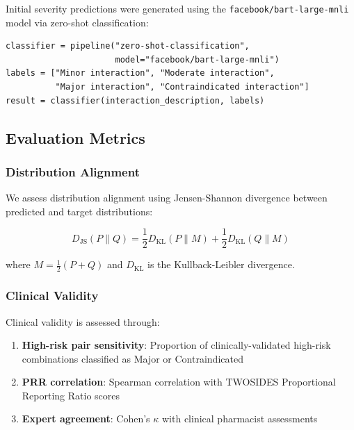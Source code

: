 \documentclass[11pt,a4paper]{article}
\begin{document}
Initial severity predictions were generated using the \texttt{facebook/bart-large-mnli} model via zero-shot classification:

\begin{verbatim}
classifier = pipeline("zero-shot-classification",
                      model="facebook/bart-large-mnli")
labels = ["Minor interaction", "Moderate interaction",
          "Major interaction", "Contraindicated interaction"]
result = classifier(interaction_description, labels)
\end{verbatim}

\subsection{Evaluation Metrics}

\subsubsection{Distribution Alignment}

We assess distribution alignment using Jensen-Shannon divergence between predicted and target distributions:

\begin{equation}
D_{\text{JS}}(P \| Q) = \frac{1}{2} D_{\text{KL}}(P \| M) + \frac{1}{2} D_{\text{KL}}(Q \| M)
\end{equation}

where $M = \frac{1}{2}(P + Q)$ and $D_{\text{KL}}$ is the Kullback-Leibler divergence.

\subsubsection{Clinical Validity}

Clinical validity is assessed through:
\begin{enumerate}
    \item \textbf{High-risk pair sensitivity}: Proportion of clinically-validated high-risk combinations classified as Major or Contraindicated
    \item \textbf{PRR correlation}: Spearman correlation with TWOSIDES Proportional Reporting Ratio scores
    \item \textbf{Expert agreement}: Cohen's $\kappa$ with clinical pharmacist assessments
\end{enumerate}

\end{document}
